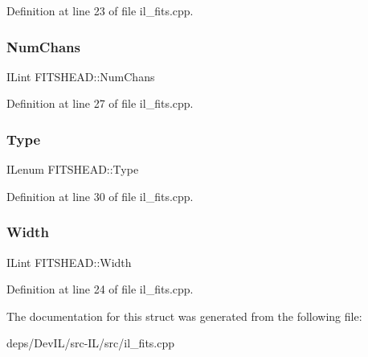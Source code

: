 Definition at line 23 of file il\+\_\+fits.\+cpp.

\mbox{\label{structFITSHEAD_a173b17e83298676ba9a5f1584aed899b}} 
\subsubsection{\texorpdfstring{Num\+Chans}{NumChans}}
{\footnotesize\ttfamily I\+Lint F\+I\+T\+S\+H\+E\+A\+D\+::\+Num\+Chans}



Definition at line 27 of file il\+\_\+fits.\+cpp.

\mbox{\label{structFITSHEAD_ae01eb4ecdd3aedd04aebb9735d3205cb}} 
\subsubsection{\texorpdfstring{Type}{Type}}
{\footnotesize\ttfamily I\+Lenum F\+I\+T\+S\+H\+E\+A\+D\+::\+Type}



Definition at line 30 of file il\+\_\+fits.\+cpp.

\mbox{\label{structFITSHEAD_a6006f8a93a64b3f1e50ba924cff29a5e}} 
\subsubsection{\texorpdfstring{Width}{Width}}
{\footnotesize\ttfamily I\+Lint F\+I\+T\+S\+H\+E\+A\+D\+::\+Width}



Definition at line 24 of file il\+\_\+fits.\+cpp.



The documentation for this struct was generated from the following file\+:\begin{DoxyCompactItemize}
\item 
deps/\+Dev\+I\+L/src-\/\+I\+L/src/il\+\_\+fits.\+cpp\end{DoxyCompactItemize}
